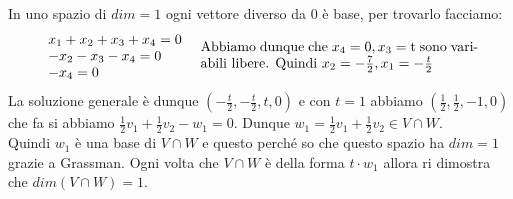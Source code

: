 \begin{example}
In uno spazio di $dim = 1$ ogni vettore diverso da 0 è base, per trovarlo facciamo:\\
\[\begin{array}{l}
    x_1 + x_2 + x_3 + x_4 = 0\\
    -x_2 - x_3 - x_4 = 0\\
    -x_4 = 0
\end{array}
\hspace{.3cm}
\parbox{7cm}{Abbiamo dunque che $x_4 = 0, x_3$ = t sono variabili libere. Quindi $x_2 = -\frac{7}{2}, x_1 = -\frac{t}{2}$}
\]
La soluzione generale è dunque $(-\frac{t}{2}, -\frac{t}{2}, t, 0)$ e con $t=1$ abbiamo $(\frac{1}{2}, \frac{1}{2}, -1, 0)$ che fa si abbiamo $\frac{1}{2}v_1 + \frac{1}{2}v_2 - w_1 = 0$. Dunque $w_1 = \frac{1}{2}v_1 + \frac{1}{2}v_2 \in V \cap W$.\\
Quindi $w_1$ è una base di $V \cap W$ e questo perché so che questo spazio ha $dim = 1$ grazie a Grassman. Ogni volta che $V \cap W$ è della forma $t \cdot w_1$ allora ri dimostra che $dim(V \cap W) = 1$.
\end{example}